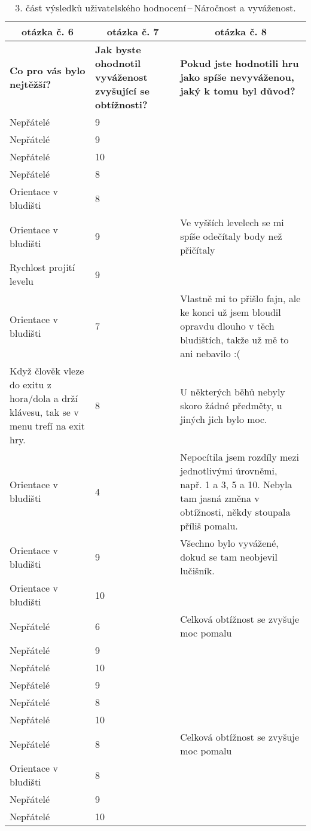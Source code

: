 \begin{table}[htbp]
\centering
\begin{tabularx}{\textwidth}{|X|X|X|}
\hline
\multicolumn{1}{|c|}{\textbf{otázka č. 6}} & \multicolumn{1}{c|}{\textbf{otázka č. 7}} & \multicolumn{1}{c|}{\textbf{otázka č. 8}} \\ \hline
\textbf{Co pro vás bylo nejtěžší?} & \textbf{Jak byste ohodnotil vyváženost zvyšující se obtížnosti?} & \textbf{Pokud jste hodnotili hru jako spíše nevyváženou, jaký k tomu byl důvod?} \\ \hline
Nepřátelé & 9 & \\ \hline
Nepřátelé & 9 & \\ \hline
Nepřátelé & 10 & \\ \hline
Nepřátelé & 8 & \\ \hline
Orientace v bludišti & 8 & \\ \hline
Orientace v bludišti & 9 & Ve vyšších levelech se mi spíše odečítaly body než přičítaly \\ \hline
Rychlost projití levelu & 9 & \\ \hline
Orientace v bludišti & 7 & Vlastně mi to přišlo fajn, ale ke konci už jsem bloudil opravdu dlouho v těch bludištích, takže už mě to ani nebavilo :( \\ \hline
Když člověk vleze do exitu z hora/dola a drží klávesu, tak se v menu trefí na exit hry. & 8 & U některých běhů nebyly skoro žádné předměty, u jiných jich bylo moc. \\ \hline
Orientace v bludišti & 4 & Nepocítila jsem rozdíly mezi jednotlivými úrovněmi, např. 1 a 3, 5 a 10. Nebyla tam jasná změna v obtížnosti, někdy stoupala příliš pomalu. \\ \hline
Orientace v bludišti & 9 & Všechno bylo vyvážené, dokud se tam neobjevil lučišník. \\ \hline
Orientace v bludišti & 10 & \\ \hline
Nepřátelé & 6 & Celková obtížnost se zvyšuje moc pomalu \\ \hline
Nepřátelé & 9 & \\ \hline
Nepřátelé & 10 & \\ \hline
Nepřátelé & 9 & \\ \hline
Nepřátelé & 8 & \\ \hline
Nepřátelé & 10 & \\ \hline
Nepřátelé & 8 & Celková obtížnost se zvyšuje moc pomalu \\ \hline
Orientace v bludišti & 8 & \\ \hline
Nepřátelé & 9 & \\ \hline
Nepřátelé & 10 & \\ \hline
\end{tabularx}
\caption{3. část výsledků uživatelského hodnocení\,--\,Náročnost a vyváženost.}
\end{table}

